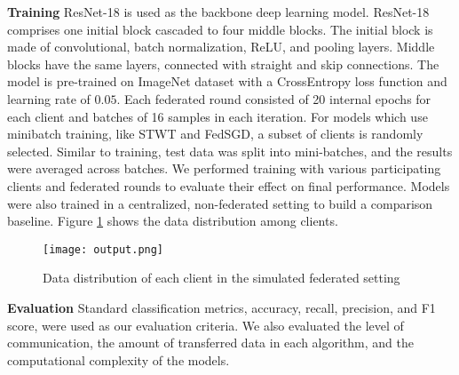 
\textbf{Training}
ResNet-18 is used as the backbone deep learning model. ResNet-18 comprises one initial block cascaded to four middle blocks. The initial block is made of convolutional,  batch normalization, ReLU, and pooling layers. Middle blocks have the same layers, connected with straight and skip connections. The model is pre-trained on ImageNet dataset \cite{he2016deep} with a CrossEntropy loss function and learning rate of $0.05$. 
Each federated round consisted of 20 internal epochs for each client and batches of 16 samples in each iteration. For models which use minibatch training, like STWT and FedSGD, a subset of clients is randomly selected. Similar to training, test data was split into mini-batches, and the results were averaged across batches. We performed training with various participating clients and federated rounds to evaluate their effect on final performance. Models were also trained in a centralized, non-federated setting to build a comparison baseline. Figure \ref{fig:distributionsite} shows the data distribution among clients.

\begin{figure}[h!]
 \centering
 \texttt{[image: output.png]}
 \caption{Data distribution of each client in the simulated federated setting}
 \label{fig:distributionsite}
\end{figure}

\textbf{Evaluation} 
Standard classification metrics, accuracy, recall, precision, and F1 score, were used as our evaluation criteria. We also evaluated the level of communication, the amount of transferred data in each algorithm, and the computational complexity of the models. 
\label{sec:experiment}
